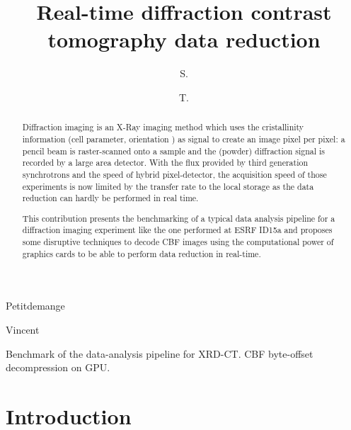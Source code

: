 \documentclass[preprint]{iucr}              %
\begin{document}

 \title{Real-time diffraction contrast tomography data reduction}

 \author[a]{S.}{Petitdemange}
 \author[a]{T.}{Vincent}
  





\maketitle                        %

\begin{synopsis}
Benchmark of the data-analysis pipeline for XRD-CT. CBF byte-offset
decompression on GPU.
\end{synopsis}

\begin{abstract}

Diffraction imaging is an X-Ray imaging method which uses the cristallinity
information (cell parameter, orientation ) as signal to create an image pixel
per pixel:
a pencil beam is raster-scanned onto a sample and the (powder) diffraction
signal is recorded by a large area detector.
With the flux provided by third generation synchrotrons and the speed of
hybrid pixel-detector, the acquisition speed of those experiments is now 
limited by the transfer rate to the local storage as the data reduction can
hardly be performed in real time.

This contribution presents the benchmarking of a typical data
analysis pipeline for a diffraction imaging experiment like the one performed at
ESRF ID15a and proposes some disruptive techniques to decode CBF images using the
computational power of graphics cards to be able to perform data reduction in
real-time.
\end{abstract}


\section{Introduction}
\end{document}
